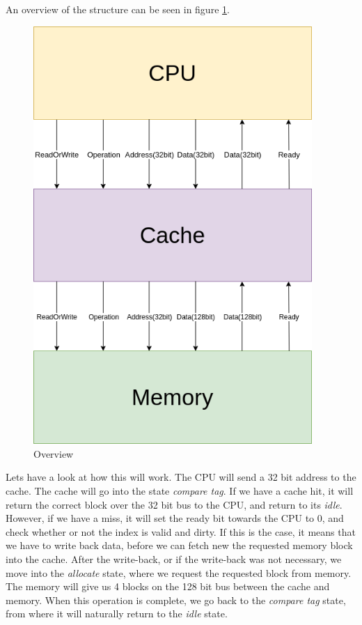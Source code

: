 \documentclass{article}
\begin{document}
An overview of the structure can be seen in figure \ref{OVERVIEW}.

\begin{figure}[H]
 \centering
  \includegraphics[width=300pt]{img/OverviewBlock.png}
 \caption{Overview}
  \label{OVERVIEW}
 \end{figure}

Lets have a look at how this will work. The CPU will send a 32 bit address to the cache. The cache will go into the state \textit{compare tag}. If we have a cache hit, it will return the correct block over the 32 bit bus to the CPU, and return to its \textit{idle}. However, if we have a miss, it will set the ready bit towards the CPU to 0, and check whether or not the index is valid and dirty. If this is the case, it means that we have to write back data, before we can fetch new the requested memory block into the cache. After the write-back, or if the write-back was not necessary, we move into the \textit{allocate} state, where we request the requested block from memory. The memory will give us 4 blocks on the 128 bit bus between the cache and memory. When this operation is complete, we go back to the \textit{compare tag} state, from where it will naturally return to the \textit{idle} state. 
\end{document}
